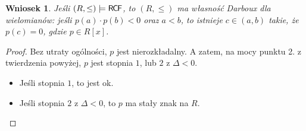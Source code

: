 \documentclass{article}
\theoremstyle{plain}
\newtheorem{wn}[thm]{Wniosek}
\theoremstyle{definition}
\theoremstyle{remark}
\newcommand{\RCF}{\mathsf{R \mkern-1.7mu C \mkern-1.4mu F}}
\begin{document}
\begin{wn}
	Jeśli $ (R, \leq) \models \RCF $, to $ (R, \leq) $ ma własność Darboux dla wielomianów:
	jeśli $ p(a) \cdot p(b) < 0 $ oraz $ a <b $, to istnieje $c \in (a, b) $ takie, że $ p(c) = 0 $, gdzie $ p \in R[x] $.
\end{wn}
\begin{proof}
	 Bez utraty ogólności, $ p $ jest nierozkładalny.
	 A zatem, na mocy punktu 2. z twierdzenia powyżej, $ p $ jest stopnia $ 1 $, lub $ 2 $ z $ \Delta < 0$.
	 \begin{itemize}
		 \item Jeśli stopnia $ 1 $, to jest ok.
		 \item Jeśli stopnia $2$ z $\Delta < 0 $, to $ p $ ma stały znak na $ R $.
	 \end{itemize}

\end{proof}
\end{document}
